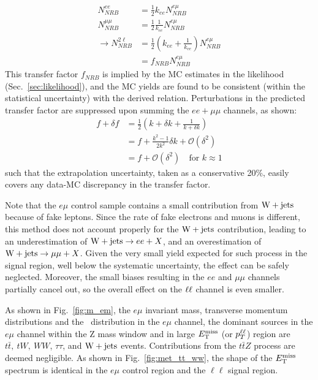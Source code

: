 \begin{equation}
\label{eq:nrb_xfer}
\begin{split}
  N^{ee}_{NRB}     &= \frac{1}{2} k_{ee} N^{e\mu}_{NRB} \\
  N^{\mu\mu}_{NRB} &= \frac{1}{2} \frac{1}{k_{ee}} N^{e\mu}_{NRB} \\
\rightarrow N^{2\ell}_{NRB}  &= \frac{1}{2} \left( k_{ee} + \frac{1}{k_{ee}} \right) N^{e\mu}_{NRB} \\
&= f_{NRB} N^{e\mu}_{NRB}
\end{split}
\end{equation}
This transfer factor $f_{NRB}$ is implied by the MC estimates in the likelihood (Sec.~\ref{sec:likelihood}),
and the MC yields are found to be consistent (within the statistical uncertainty) with the derived relation.
Perturbations in the predicted transfer factor are suppressed upon summing the $ee+\mu\mu$ channels, as shown:
\begin{equation}
\begin{split}
  f + \delta f &= \frac{1}{2} \left( k + \delta k + \frac{1}{k + \delta k} \right) \\
  &= f + \frac{k^2-1}{2k^2} \delta k + \mathcal{O}(\delta^2) \\
  &= f + \mathcal{O}(\delta^2) \quad \text{for } k \approx 1
\end{split}
\end{equation}
such that the extrapolation uncertainty, taken as a conservative 20\%, easily covers any data-MC discrepancy
in the transfer factor.

Note that the $e\mu$ control sample contains a small contribution from
$\mathrm{W}+{\mathrm{jets}}$ because of fake leptons. Since the rate of fake
electrons and muons is different, this method does not account
properly for the $\mathrm{W}+{\mathrm{jets}}$ contribution, leading to an
underestimation of $\mathrm{W}+{\mathrm{jets}}\to ee+X$, and an
overestimation of $\mathrm{W}+{\mathrm{jets}}\to \mu\mu+X$. Given the very 
small yield expected for such process in the signal region, well below
the systematic uncertainty, the effect can be safely
neglected. Moreover, the small biases resulting in the $ee$ and
$\mu\mu$ channels partially cancel out, so the overall effect on the
$\ell\ell$ channel is even smaller. 

As shown in Fig.~\ref{fig:m_em},
the $e\mu$ invariant mass, transverse momentum distributions and the \met\ distribution in
the $e\mu$ channel, the dominant sources in the $e\mu$ channel within
the Z mass window and in large $E_{\mathrm{T}}^{\text{miss}}$ (or $p_{T}^{\ell\ell}$) region are
$t\bar t, \ tW, \ WW $, $\tau\tau$, and $\mathrm{W}+{\mathrm{jets}}$ events. Contributions from the $t\bar t Z$ process
are deemed negligible.
As shown in Fig.~\ref{fig:met_tt_ww}, the shape of the $E_\mathrm{T}^{\mathrm{miss}}$ spectrum is identical in the $e\mu$ control region
and the $\ell\ell$ signal region.


